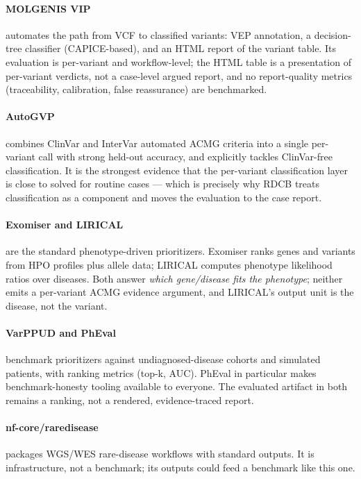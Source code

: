 \documentclass[11pt]{article}
\begin{document}
\paragraph{MOLGENIS VIP} automates the path from VCF to classified variants:
VEP annotation, a decision-tree classifier (CAPICE-based), and an HTML report of the
variant table. Its evaluation is per-variant and workflow-level; the HTML table is a
presentation of per-variant verdicts, not a case-level argued report, and no
report-quality metrics (traceability, calibration, false reassurance) are
benchmarked.

\paragraph{AutoGVP} combines ClinVar and InterVar automated ACMG criteria into a
single per-variant call with strong held-out accuracy, and explicitly tackles
ClinVar-free classification. It is the strongest evidence that the per-variant
classification layer is close to solved for routine cases --- which is precisely why
RDCB treats classification as a component and moves the evaluation to the case
report.

\paragraph{Exomiser and LIRICAL} are the standard phenotype-driven prioritizers.
Exomiser ranks genes and variants from HPO profiles plus allele data; LIRICAL
computes phenotype likelihood ratios over diseases. Both answer \emph{which
gene/disease fits the phenotype}; neither emits a per-variant ACMG evidence
argument, and LIRICAL's output unit is the disease, not the variant.

\paragraph{VarPPUD and PhEval} benchmark prioritizers against undiagnosed-disease
cohorts and simulated patients, with ranking metrics (top-k, AUC). PhEval in
particular makes benchmark-honesty tooling available to everyone. The evaluated
artifact in both remains a ranking, not a rendered, evidence-traced report.

\paragraph{nf-core/raredisease} packages WGS/WES rare-disease workflows with
standard outputs. It is infrastructure, not a benchmark; its outputs could feed a
benchmark like this one.
\end{document}

